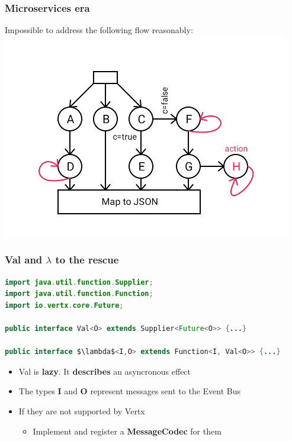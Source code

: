 \documentclass{beamer}
\begin{document}
\begin{frame}
\frametitle{Microservices era}    
Impossible to address the following flow reasonably:
\includegraphics[scale=0.4]{images/flow-2.png}
\end{frame} 

\begin{frame}[fragile] 
\frametitle{Val and $\lambda$  to the rescue}
\begin{lstlisting}[language=Java,numbers=none,mathescape=true]
import java.util.function.Supplier;
import java.util.function.Function;
import io.vertx.core.Future;

public interface Val<O> extends Supplier<Future<O>> {...}

public interface $\lambda$<I,O> extends Function<I, Val<O>> {...}

\end{lstlisting}

\clearpage

\begin{itemize}
 \item<1->  Val is \textbf{lazy}. It \textbf{describes} an asyncronous effect
 \item<2-> The types \textbf{I} and \textbf{O} represent messages sent to the Event Bus 
 \item<3-> If they are not supported by Vertx
       \begin{itemize}
        \item<4-> Implement and register a \textbf{MessageCodec} for them
      \end{itemize}
 \end{itemize}

\end{frame}
\end{document}
